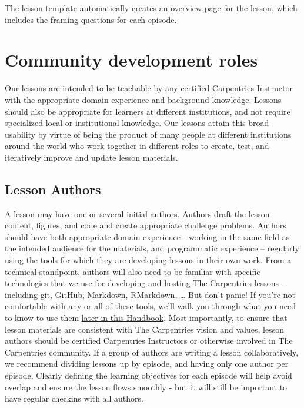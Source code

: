 \documentclass[
]{book}
\begin{document}
The lesson template automatically creates \href{https://datacarpentry.org/shell-genomics/}{an overview page} for the lesson, which includes the framing
questions for each episode.

\hypertarget{community-development-roles}{%
\chapter{Community development roles}\label{community-development-roles}}

Our lessons are intended to be teachable by any certified
Carpentries Instructor with the appropriate domain experience
and background knowledge. Lessons should also be appropriate for
learners at different institutions, and not require specialized
local or institutional knowledge. Our lessons attain this
broad usability by virtue of being the product of many people
at different institutions around the world who work together
in different roles to create, test, and iteratively improve and
update lesson materials.

\hypertarget{lesson-authors}{%
\section{Lesson Authors}\label{lesson-authors}}

A lesson may have one or several initial authors. Authors draft
the lesson content, figures, and code and create appropriate challenge problems. Authors should have both appropriate domain
experience - working in the same field as the intended audience for the materials,
and programmatic experience -- regularly using the tools for which they are
developing lessons in their own work. From a technical standpoint, authors
will also need to be familiar with specific technologies that we use for
developing and hosting The Carpentries lessons - including git, GitHub, Markdown,
RMarkdown, \ldots{} But don't panic! If you're not comfortable with any or all of these
tools, we'll walk you through what you need to know to use them \protect\hyperlink{technological-introductions}{later in this
Handbook}. Most importantly, to ensure that lesson materials are consistent with The Carpentries vision and
values,
lesson authors should be certified Carpentries Instructors or otherwise involved
in The Carpentries community. If a group of authors are writing a lesson
collaboratively, we recommend dividing lessons up by episode, and having only one
author per episode. Clearly defining the learning objectives for each episode
will help avoid overlap and ensure the lesson flows smoothly - but it will
still be important to have regular checkins with all authors.
\end{document}
